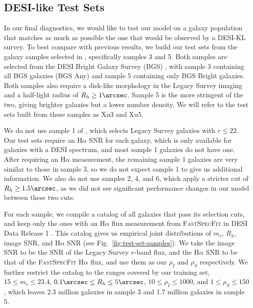 \subsection{DESI-like Test Sets}
\label{ssec:test-set}

In our final diagnostics, we would like to test our model on a galaxy population that matches as much as possible the one that would be observed by a DESI-KL survey. To best compare with previous results, we build our test sets from the galaxy samples selected in \citep{KLDESI}, specifically samples 3 and 5. Both samples are selected from the DESI Bright Galaxy Survey (BGS) \citep{BGS}, with sample 3 containing all BGS galaxies (BGS Any) and sample 5 containing only BGS Bright galaxies. Both samples also require a disk-like morphology in the Legacy Survey imaging \citep{LSImaging} and a half-light radius of $R_h \geq 1\arcsec$. Sample 5 is the more stringent of the two, giving brighter galaxies but a lower number density. We will refer to the test sets built from these samples as Xu3 and Xu5.

We do not use sample 1 of \citep{KLDESI}, which selects Legacy Survey galaxies with $r \leq 22$. Our test sets require an H$\alpha$ SNR for each galaxy, which is only available for galaxies with a DESI spectrum, and most sample 1 galaxies do not have one. After requiring an H$\alpha$ measurement, the remaining sample 1 galaxies are very similar to those in sample 3, so we do not expect sample 1 to give us additional information.  We also do not use samples 2, 4, and 6, which apply a stricter cut of $R_h \geq 1.5\arcsec$, as we did not see significant performance changes in our model between these two cuts.

For each sample, we compile a catalog of all galaxies that pass its selection cuts, and keep only the ones with an H$\alpha$ flux measurement from \textsc{FastSpecFit} \citep{FastSpecFit} in DESI Data Release 1 \citep{DESIDR1}. This catalog gives us empirical joint distributions of $m_r$, $R_h$, image SNR, and H$\alpha$ SNR (see Fig.~\ref{fig:test-set-samples}). We take the image SNR to be the SNR of the Legacy Survey $r$-band flux, and the H$\alpha$ SNR to be that of the \textsc{FastSpecFit} H$\alpha$ flux, and use them as our $\rho_I$ and $\rho_S$ respectively. We further restrict the catalog to the ranges covered by our training set, $15 \leq m_r \leq 23.4$, $0.1\arcsec \leq R_h \leq 5\arcsec$, $10 \leq \rho_I \leq 1000$, and $1 \leq \rho_S \leq 150$, which leaves 2.3 million galaxies in sample 3 and 1.7 million galaxies in sample 5.

